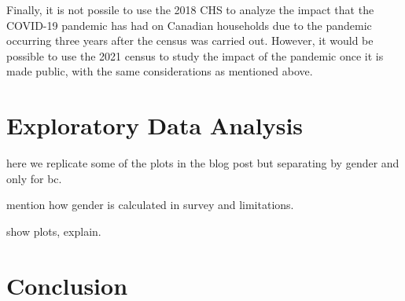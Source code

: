 \documentclass[11pt]{article}
\begin{document}
Finally, it is not possile to use the 2018 CHS to analyze the impact that
the COVID-19 pandemic has had on Canadian households due to the pandemic
occurring three years after the census was carried out. However, it would
be possible to use the 2021 census to study the impact of the pandemic
once it is made public, with the same considerations as mentioned above.




\section{Exploratory Data Analysis} \label{sec:eda}

here we replicate some of the plots in the blog post but separating by gender and only for bc.

mention how gender is calculated in survey and limitations.

show plots, explain.




\section{Conclusion} \label{sec:conclusion}





\clearpage


\end{document}
